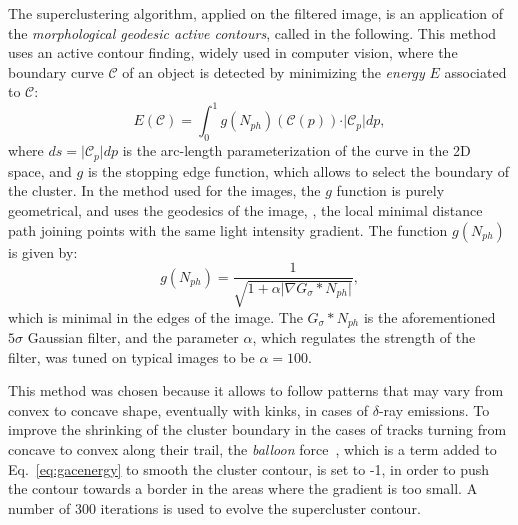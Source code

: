 The superclustering algorithm, applied on the filtered image, is an
application of the \textit{morphological geodesic active
contours}\cite{gac,mgac}, called \gac in the following.  This method
uses an active contour finding, widely used in computer vision, where
the boundary curve $\mathcal{C}$ of an object is detected by
minimizing the \textit{energy} $E$  associated to $\mathcal{C}$:
\begin{equation}
  \label{eq:gacenergy}
  E(\mathcal{C}) = \int_{0}^{1} g(N_{ph})(\mathcal{C}(p)) \cdot \vert\mathcal{C}_p\vert dp,
\end{equation}
where $ds=\vert\mathcal{C}_p\vert dp$ is the arc-length
parameterization of the curve in the 2D space, and $g$ is the stopping
edge function, which allows to select the boundary of the cluster.  In
the \gac method used for the \lemon images, the $g$ function is purely
geometrical, and uses the geodesics of the image, \ie, the local
minimal distance path joining points with the same light intensity
gradient. The function $g(N_{ph})$ is given by:
\begin{equation}
g(N_{ph}) = \frac{1}{\sqrt{1+\alpha\vert\nabla G_\sigma * N_{ph}\vert}},
\end{equation}
which is minimal in the edges of the image.  The $G_\sigma * N_{ph}$ is the
aforementioned $5\sigma$ Gaussian filter, and the parameter $\alpha$,
which regulates the strength of the filter, was tuned on
typical \lemon images to be $\alpha=100$.

This method was chosen because it allows to follow patterns that
may vary from convex to concave shape, eventually with kinks, \eg in
cases of $\delta$-ray emissions. To improve the shrinking of the
cluster boundary in the cases of tracks turning from concave to convex
along their trail, the \textit{balloon} force~\cite{mgac}, which is a
term added to Eq.~\ref{eq:gacenergy} to smooth the cluster contour, is
set to -1, in order to push the contour towards a border in the areas
where the gradient is too small. A number of 300 iterations is used to
evolve the supercluster contour.

